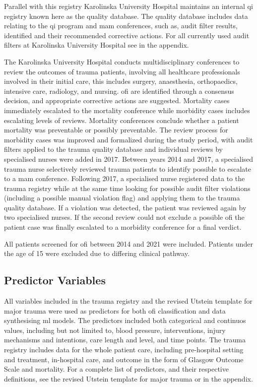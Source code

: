 \documentclass[12pt, letterpaper]{article}
\begin{document}
Parallel with this registry Karolinska University Hospital maintains an internal \acrshort{qi} registry known here as the quality database. The quality database includes data relating to the \acrshort{qi} program and \acrshort{mam} conferences, such as, audit filter results, identified  and their recommended corrective actions. For all currently used audit filters at Karolinska University Hospital see  in the appendix.

The Karolinska University Hospital conducts multidisciplinary conferences to review the outcomes of trauma patients, involving all healthcare professionals involved in their initial care, this includes surgery, anaesthesia, orthopaedics, intensive care, radiology, and nursing. \acrshort{ofi} are identified through a consensus decision, and appropriate corrective actions are suggested. Mortality cases immediately escalated to the mortality conference while morbidity cases includes escalating levels of reviews. Mortality conferences conclude whether a patient mortality was preventable or possibly preventable. The review process for morbidity cases was improved and formalized during the study period, with audit filters applied to the trauma quality database and individual reviews by specialised nurses were added in 2017. Between years 2014 and 2017, a specialised trauma nurse selectively reviewed trauma patients to identify possible  to escalate to a \acrshort{mam} conference. Following 2017, a specialised nurse registered data to the trauma registry while at the same time looking for possible audit filter violations (including a possible manual violation flag) and applying them to the trauma quality database. If a violation was detected, the patient was reviewed again by two specialised nurses. If the second review could not exclude a possible \acrshort{ofi} the patient case was finally escalated to a morbidity conference for a final verdict.

All patients screened for \acrshort{ofi} between 2014 and 2021 were included. Patients under the age of 15 were excluded due to differing clinical pathway.

\subsection{Predictor Variables}
All variables included in the trauma registry and the revised Utstein template for major trauma were used as predictors for both \acrshort{ofi} classification and data synthesising \acrshort{ml} models. The predictors included both categorical and continuos values, including but not limited to, blood pressure, interventions, injury mechanisms and intentions, care length and level, and time points. The trauma registry includes data for the whole patient care, including pre-hospital setting and treatment, in-hospital care, and outcome in the form of Glasgow Outcome Scale and mortality. For a complete list of predictors, and their respective definitions, see the revised Utstein template for major trauma \cite{ringdal_utstein_2008} or  in the appendix.
\end{document}
